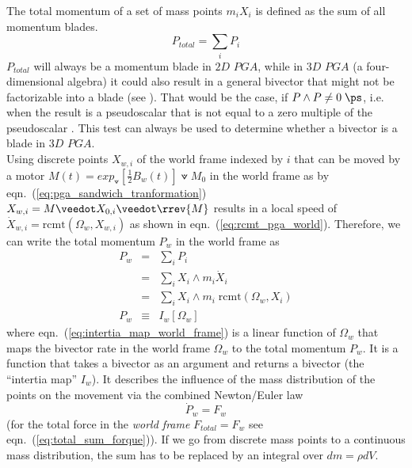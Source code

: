 The total momentum of a set of mass points $m_i X_i$ is defined as the sum of all momentum
blades.
\begin{equation}
    P_{total} = \sum_i{P_i}
    \label{eq:total_sum_momentum}
\end{equation}
$P_{total}$ will always be a momentum blade in $2D$ $PGA$, while in $3D$ $PGA$ (a
four-dimensional algebra) it could also result in a general bivector that might not be
factorizable into a blade (see \cite{Browne_Grassmann-Algebra_Vol1:2012}). That would be
the case, if $P \wedge P \ne 0 \; \ps$, i.e. when the result is a pseudoscalar that is not
equal to a zero multiple of the pseudoscalar . This test can always be used to
determine whether a bivector is a blade in $3D$ $PGA$. \\

Using discrete points $X_{w,i}$ of the world frame indexed by $i$ that can be moved by a
motor $M(t) = exp_\veedot[\frac{1}{2} B_w(t)] \veedot M_0$ in the world frame as by
eqn.~(\ref{eq:pga_sandwich_tranformation}) $X_{w,i} = M \veedot X_{0,i} \veedot \rrev{M}$
results in a local speed of $\dot{X}_{w,i} = \mathrm{rcmt}(\Omega_w,X_{w,i})$ as shown in
eqn.~(\ref{eq:rcmt_pga_world}). Therefore, we can write the total momentum $P_{w}$ in the
world frame as
\begin{eqnarray}
    P_{w} &=& \sum_i{P_i} \nonumber \\
          &=& \sum_i X_i \wedge m_i \dot{X}_i \nonumber \\
          &=& \sum_i X_i \wedge m_i \; \mathrm{rcmt}(\Omega_w,X_i) \nonumber \\
    P_{w} &\equiv& I_w[\Omega_w]
                \label{eq:intertia_map_world_frame}
\end{eqnarray}
where eqn.~(\ref{eq:intertia_map_world_frame}) is a linear function of $\Omega_w$ that
maps the bivector rate in the world frame $\Omega_w$ to the total momentum $P_w$. It is a
function that takes a bivector as an argument and returns a bivector (the ``intertia map''
$I_w$). It describes the influence of the mass distribution of the points on the movement
via the combined Newton/Euler law
\begin{equation}
    \dot{P}_{w}=F_{w}
    \label{eq:Newton_Euler_law}
\end{equation}
(for the total force in the \emph{world frame} $F_{total} = F_{w}$ see
eqn.~(\ref{eq:total_sum_forque})). If we go from discrete mass points to a continuous mass
distribution, the sum has to be replaced by an integral over $dm = \rho dV$. \\

